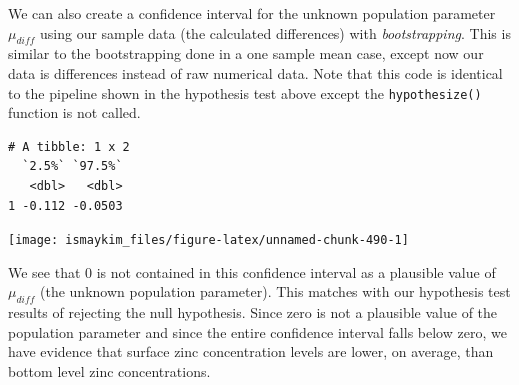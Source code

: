 \documentclass[12pt, krantz2,]{krantz}
\makeatletter
\newenvironment{Shaded}{\begin{snugshade}}{\end{snugshade}}
\newcommand{\DataTypeTok}[1]{\textcolor[rgb]{0.27,0.27,0.27}{#1}}
\newcommand{\DecValTok}[1]{\textcolor[rgb]{0.06,0.06,0.06}{#1}}
\newcommand{\KeywordTok}[1]{\textcolor[rgb]{0.27,0.27,0.27}{\textbf{#1}}}
\newcommand{\NormalTok}[1]{#1}
\newcommand{\OperatorTok}[1]{\textcolor[rgb]{0.43,0.43,0.43}{\textbf{#1}}}
\newcommand{\StringTok}[1]{\textcolor[rgb]{0.5,0.5,0.5}{#1}}
\newenvironment{kframe}{%
\medskip{}
\setlength{\fboxsep}{.8em}
 \def\at@end@of@kframe{}%
 \ifinner\ifhmode%
  \def\at@end@of@kframe{\end{minipage}}%
  \begin{minipage}{\columnwidth}%
 \fi\fi%
 \def\FrameCommand##1{\hskip\@totalleftmargin \hskip-\fboxsep
 \colorbox{shadecolor}{##1}\hskip-\fboxsep
     \hskip-\linewidth \hskip-\@totalleftmargin \hskip\columnwidth}%
 \MakeFramed {\advance\hsize-\width
   \@totalleftmargin\z@ \linewidth\hsize
   \@setminipage}}%
 {\par\unskip\endMakeFramed%
 \at@end@of@kframe}
\renewenvironment{Shaded}{\begin{kframe}}{\end{kframe}}
\makeatother
\begin{document}
We can also create a confidence interval for the unknown population parameter \(\mu_{diff}\) using our sample data (the calculated differences) with \emph{bootstrapping}. This is similar to the bootstrapping done in a one sample mean case, except now our data is differences instead of raw numerical data.
Note that this code is identical to the pipeline shown in the hypothesis test above except the \texttt{hypothesize()} function is not called.

\begin{Shaded}
\end{Shaded}

\begin{Shaded}
\end{Shaded}

\begin{verbatim}
# A tibble: 1 x 2
  `2.5%` `97.5%`
   <dbl>   <dbl>
1 -0.112 -0.0503
\end{verbatim}

\begin{Shaded}
\end{Shaded}

\begin{center}\texttt{[image: ismaykim\_files/figure-latex/unnamed-chunk-490-1]} \end{center}

We see that 0 is not contained in this confidence interval as a plausible value of \(\mu_{diff}\) (the unknown population parameter). This matches with our hypothesis test results of rejecting the null hypothesis. Since zero is not a plausible value of the population parameter and since the entire confidence interval falls below zero, we have evidence that surface zinc concentration levels are lower, on average, than bottom level zinc concentrations.
\end{document}

